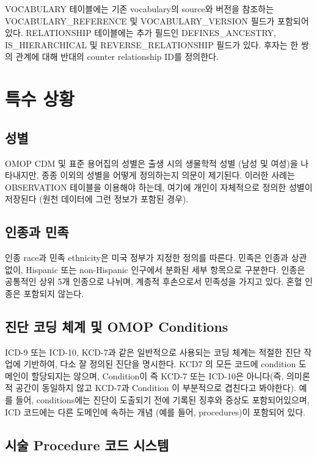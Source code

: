 \documentclass[10.5pt]{book}
\theoremstyle{definition}
\theoremstyle{definition}
\theoremstyle{definition}
\theoremstyle{remark}
\begin{document}
VOCABULARY 테이블에는 기존 vocabulary의 source와 버전을 참조하는
VOCABULARY\_REFERENCE 및 VOCABULARY\_VERSION 필드가 포함되어 있다.
RELATIONSHIP 테이블에는 추가 필드인 DEFINES\_ANCESTRY, IS\_HIERARCHICAL
및 REVERSE\_RELATIONSHIP 필드가 있다. 후자는 한 쌍의 관계에 대해 반대의
counter relationship ID를 정의한다.

\section{특수 상황}\label{specialSituations}

\subsection{성별}

OMOP CDM 및 표준 용어집의 성별은 출생 시의 생물학적 성별 (남성 및
여성)을 나타내지만, 종종 이외의 성별을 어떻게 정의하는지 의문이
제기된다. 이러한 사례는 OBSERVATION 테이블을 이용해야 하는데, 여기에
개인이 자체적으로 정의한 성별이 저장된다 (원천 데이터에 그런 정보가
포함된 경우).

\subsection{인종과 민족}\label{-}

인종 race과 민족 ethnicity은 미국 정부가 지정한 정의를 따른다. 민족은
인종과 상관없이, Hispanic 또는 non-Hispanic 인구에서 분화된 세부
항목으로 구분한다. 인종은 공통적인 상위 5개 인종으로 나뉘며, 계층적
후손으로서 민족성을 가지고 있다. 혼혈 인종은 포함되지 않는다.

\subsection{진단 코딩 체계 및 OMOP
Conditions}\label{----omop-conditions}

ICD-9 또는 ICD-10, KCD-7과 같은 일반적으로 사용되는 코딩 체계는 적절한
진단 작업에 기반하여, 다소 잘 정의된 진단을 명시한다. KCD7 의 모든
코드에 condition 도메인이 할당되지는 않으며, Condition이 즉 KCD-7 또는
ICD-10은 아니다(즉, 의미론적 공간이 동일하지 않고 KCD-7과 Condition 이
부분적으로 겹친다고 봐야한다). 예를 들어, conditions에는 진단이 도출되기
전에 기록된 징후와 증상도 포함되어있으며, ICD 코드에는 다른 도메인에
속하는 개념 (예를 들어, procedures)이 포함되어 있다.

\subsection{시술 Procedure 코드 시스템}\label{-procedure--}
\end{document}
